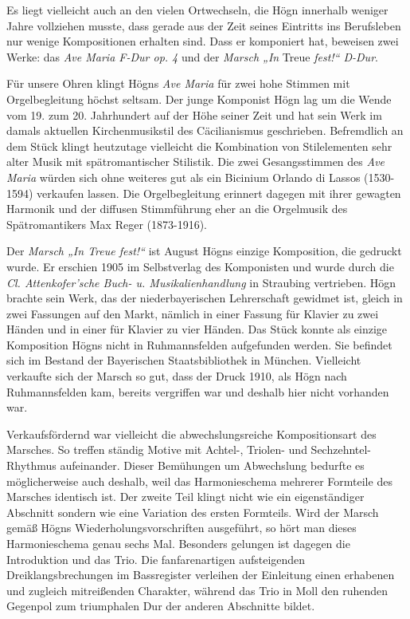 \documentclass{book}
\begin{document}
Es liegt vielleicht auch an den vielen Ortwechseln, die Högn innerhalb
we\-niger Jahre vollziehen musste, dass gerade aus der Zeit seines
Eintritts ins Berufsleben nur wenige Kompositionen erhalten sind. Dass
er komponiert hat, beweisen zwei Werke: das \textit{Ave Maria F-Dur op.
4} und der \textit{Marsch „In} Treue \textit{fest!“ D-Dur}.

Für unsere Ohren klingt Högns \textit{Ave Maria }für zwei hohe Stimmen
mit Or\-gelbegleitung höchst seltsam. Der junge Komponist Högn lag um
die Wende vom 19. zum 20. Jahrhundert auf der Höhe seiner Zeit und hat
sein Werk im damals aktuellen Kirchenmusikstil des Cäcilianismus
geschrieben. Befremdlich an dem Stück klingt heutzutage vielleicht die
Kombination von Stilelementen sehr alter Musik mit spätromantischer
Stilistik. Die zwei Gesangsstimmen des \textit{Ave Maria} würden sich
ohne weiteres gut als ein Bicinium Orlando di Lassos (1530-1594)
verkaufen lassen. Die Orgelbegleitung erinnert dagegen mit ihrer
gewagten Harmonik und der diffusen Stimmführung eher an die Orgelmusik
des Spätromantikers Max Reger (1873-1916). 

Der \textit{Marsch „In Treue fest!“} ist August Högns einzige
Komposition, die ge\-druckt wurde. Er erschien 1905 im Selbstverlag des
Komponisten und wurde durch die \textit{Cl. Attenkofer’sche Buch- u.
Musikalienhandlung} in Straubing vertrieben. Högn brachte sein Werk,
das der niederbayerischen Lehrerschaft gewidmet ist, gleich in zwei
Fassungen auf den Markt, nämlich in einer Fassung für Klavier zu zwei
Händen und in einer für Klavier zu vier Händen. Das Stück konnte als
einzige Komposition Högns nicht in Ruhmannsfelden aufgefunden wer\-den.
Sie befindet sich im Bestand der Bayerischen Staatsbibliothek in
Mün\-chen. Vielleicht verkaufte sich der Marsch so gut, dass der Druck
1910, als Högn nach Ruhmannsfelden kam, bereits vergriffen war und
deshalb hier nicht vorhanden war.


Verkaufsfördernd war vielleicht die abwechslungsreiche Kompositionsart
des Marsches. So treffen ständig Motive mit Achtel-, Triolen- und
Sechzehntel-Rhythmus aufeinander. Dieser Bemühungen um Abwechslung
bedurfte es möglicherweise auch deshalb, weil das Harmonieschema
mehrerer Formteile des Marsches identisch ist. Der zweite Teil klingt
nicht wie ein eigenständiger Abschnitt sondern wie eine Variation des
ersten Formteils. Wird der Marsch gemäß Högns Wiederholungsvorschriften
ausgeführt, so hört man dieses Har\-monieschema genau sechs Mal.
Besonders gelungen ist dagegen die Introduk\-tion und das Trio. Die
fanfarenartigen aufsteigenden Dreiklangsbrechungen im Bassregister
verleihen der Einleitung einen erhabenen und zugleich mit\-reißenden
Charakter, während das Trio in Moll den ruhenden Gegenpol zum
triumphalen Dur der anderen Abschnitte bildet.
\end{document}
